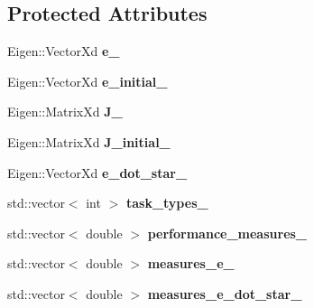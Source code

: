 \subsection*{Protected Attributes}
\begin{DoxyCompactItemize}
\item 
\hypertarget{classhiqp_1_1TaskFunction_add51e374b24c5179474709286b62a54d}{Eigen\-::\-Vector\-Xd {\bfseries e\-\_\-}}\label{classhiqp_1_1TaskFunction_add51e374b24c5179474709286b62a54d}

\item 
\hypertarget{classhiqp_1_1TaskFunction_ae0634f16b16eab8804cdef09ca2b8f34}{Eigen\-::\-Vector\-Xd {\bfseries e\-\_\-initial\-\_\-}}\label{classhiqp_1_1TaskFunction_ae0634f16b16eab8804cdef09ca2b8f34}

\item 
\hypertarget{classhiqp_1_1TaskFunction_a6799e07904601184a713b5f10039bc33}{Eigen\-::\-Matrix\-Xd {\bfseries J\-\_\-}}\label{classhiqp_1_1TaskFunction_a6799e07904601184a713b5f10039bc33}

\item 
\hypertarget{classhiqp_1_1TaskFunction_ae8920244fed253580ee68e1d97c0c1ea}{Eigen\-::\-Matrix\-Xd {\bfseries J\-\_\-initial\-\_\-}}\label{classhiqp_1_1TaskFunction_ae8920244fed253580ee68e1d97c0c1ea}

\item 
\hypertarget{classhiqp_1_1TaskFunction_a31661efda6f8cbb197e4b188c7ac070a}{Eigen\-::\-Vector\-Xd {\bfseries e\-\_\-dot\-\_\-star\-\_\-}}\label{classhiqp_1_1TaskFunction_a31661efda6f8cbb197e4b188c7ac070a}

\item 
\hypertarget{classhiqp_1_1TaskFunction_a3dbcd166e38dc81a4ab81a6f902688dd}{std\-::vector$<$ int $>$ {\bfseries task\-\_\-types\-\_\-}}\label{classhiqp_1_1TaskFunction_a3dbcd166e38dc81a4ab81a6f902688dd}

\item 
\hypertarget{classhiqp_1_1TaskFunction_ae3bf05a29068234cf202b80472f45c25}{std\-::vector$<$ double $>$ {\bfseries performance\-\_\-measures\-\_\-}}\label{classhiqp_1_1TaskFunction_ae3bf05a29068234cf202b80472f45c25}

\item 
\hypertarget{classhiqp_1_1TaskFunction_a815eff712a5d210e5c0ac3793ba93d7c}{std\-::vector$<$ double $>$ {\bfseries measures\-\_\-e\-\_\-}}\label{classhiqp_1_1TaskFunction_a815eff712a5d210e5c0ac3793ba93d7c}

\item 
\hypertarget{classhiqp_1_1TaskFunction_a5ce42f57c0e92a345b5da16142476f1a}{std\-::vector$<$ double $>$ {\bfseries measures\-\_\-e\-\_\-dot\-\_\-star\-\_\-}}\label{classhiqp_1_1TaskFunction_a5ce42f57c0e92a345b5da16142476f1a}


\end{DoxyCompactItemize}
